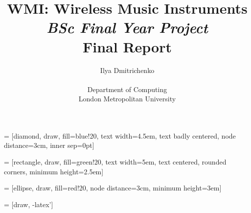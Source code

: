 \newcommand{\TEP}[1]{\AltRef{\emph{TEP#1}}{http://www.tinyos.net/tinyos-2.x/doc/pdf/tep#1.pdf}{links:tinyos:tep:#1}}



\newcommand{\MAN}[1]{\AltRef{\emph{\texttt{#1}}}{http://manpages.debian.net/cgi-bin/man.cgi?query=#1&sektion=0&format=ascii}{doc:linux:man:0:#1}}
\newcommand{\MANX}[2]{\AltRef{\emph{\texttt{#2}}}{http://manpages.debian.net/cgi-bin/man.cgi?query=#2&sektion=#1&format=ascii}{doc:linux:man:#1:#2}}


\newcommand{\Blob}[1]{\Href{https://github.com/errordeveloper/contiki-wmi/blob/wmi-work/#1}{\texttt{#1}}}
\newcommand{\Tree}[1]{\Href{https://github.com/errordeveloper/contiki-wmi/tree/wmi-work/#1}{\texttt{#1}}}
\newcommand{\Blame}[1]{\Href{https://github.com/errordeveloper/contiki-wmi/blame/wmi-work/#1}{\texttt{#1}}}
\newcommand{\Logs}[1]{\Href{https://github.com/errordeveloper/contiki-wmi/commits/wmi-work/#1}{\texttt{#1}}}
\newcommand{\Contrib}[1]{\Href{https://github.com/errordeveloper/contiki-wmi/commits/wmi-work/#1?author=errordeveloper}{\texttt{#1}}}

\usepackage{tikz}
\usetikzlibrary{automata,positioning,shapes,arrows}

 = [diamond,
			draw, fill=blue!20,
			text width=4.5em, text badly centered,
			node distance=3cm, inner sep=0pt]

 = [rectangle,
			draw, fill=green!20,
			text width=5em, text centered,
			rounded corners, minimum height=2.5em]

 = [ellipse,
			draw, fill=red!20,
			node distance=3cm, minimum height=3em]

 = [draw, -latex']

\usepackage{pstricks-add}


\title{WMI: Wireless Music Instruments\\ \emph{BSc Final Year Project} \\ Final Report}
\author{Ilya Dmitrichenko \\ \\ Department of Computing\\ London Metropolitan University}

